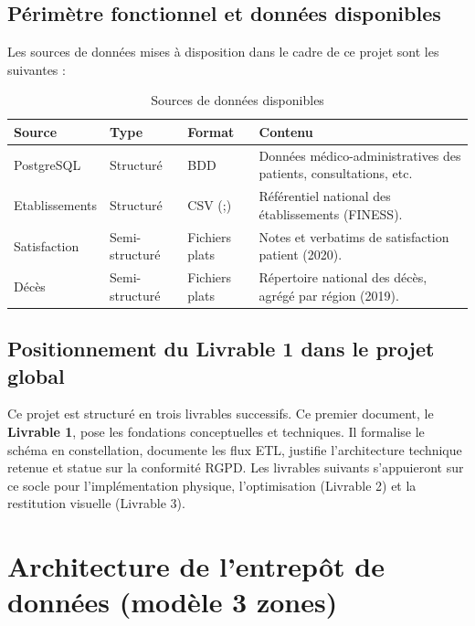 \documentclass[12pt, a4paper]{report}
\begin{document}
\section{Périmètre fonctionnel et données disponibles}
Les sources de données mises à disposition dans le cadre de ce projet sont les suivantes :

\begin{table}[H]
    \centering
    \begin{tabularx}{\textwidth}{@{}l l l X@{}}
    \toprule
    \rowcolor{chuBlue!15}
    \textbf{Source} & \textbf{Type} & \textbf{Format} & \textbf{Contenu} \\
    \midrule
    PostgreSQL & Structuré & BDD & Données médico-administratives des patients, consultations, etc. \\
    \rowcolor{chuGray}
    Etablissements & Structuré & CSV (;) & Référentiel national des établissements (FINESS). \\
    Satisfaction & Semi-structuré & Fichiers plats & Notes et verbatims de satisfaction patient (2020). \\
    \rowcolor{chuGray}
    Décès & Semi-structuré & Fichiers plats & Répertoire national des décès, agrégé par région (2019). \\
    \bottomrule
    \end{tabularx}
    \caption{Sources de données disponibles}
\end{table}

\section{Positionnement du Livrable 1 dans le projet global}
Ce projet est structuré en trois livrables successifs. Ce premier document, le \textbf{Livrable 1}, pose les fondations conceptuelles et techniques. Il formalise le schéma en constellation, documente les flux ETL, justifie l'architecture technique retenue et statue sur la conformité RGPD. Les livrables suivants s'appuieront sur ce socle pour l'implémentation physique, l'optimisation (Livrable 2) et la restitution visuelle (Livrable 3).



\chapter{Architecture de l'entrepôt de données (modèle 3 zones)}
\end{document}
